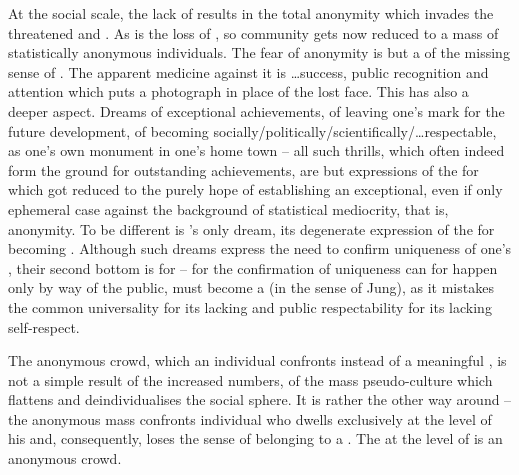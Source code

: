 \pa
At the social scale, the lack of  results in the total
anonymity which invades the threatened and . As
 is the loss of , so community gets now reduced
to a mass of statistically anonymous individuals. The fear of anonymity
is but a  of the missing sense of . The apparent 
medicine against it is \ldots success, public recognition and attention which
puts a photograph in place of the lost face. %
This has also a deeper aspect. Dreams of exceptional achievements, of leaving
one's mark for the future development, of becoming
socially/politically/scientifically/\ldots respectable, as one's own monument in
one's home town -- all such  thrills, which often indeed form the
ground for outstanding achievements, are but expressions of the  for
 which got reduced to the purely  hope of establishing
an exceptional, even if only ephemeral case against the background of
statistical mediocrity, that is, anonymity. To be different is 's only
dream, its degenerate expression of the  for becoming .
Although such dreams express the need to confirm uniqueness of one's ,
their second bottom is  for  -- for the confirmation of
uniqueness can for  happen only by way of the public,  must
become a  (in the sense of Jung), as it mistakes the common
universality for its lacking  and public respectability for its
lacking self-respect.


The anonymous crowd, which an individual confronts instead of a meaningful
, is not a simple result of the increased numbers, of the mass
pseudo-culture which flattens and deindividualises the social sphere. It is
rather the other way around -- the anonymous mass confronts individual who
dwells exclusively at the level of his  and, consequently, loses the
 sense of belonging to a . The  at the level of  is an anonymous crowd.

